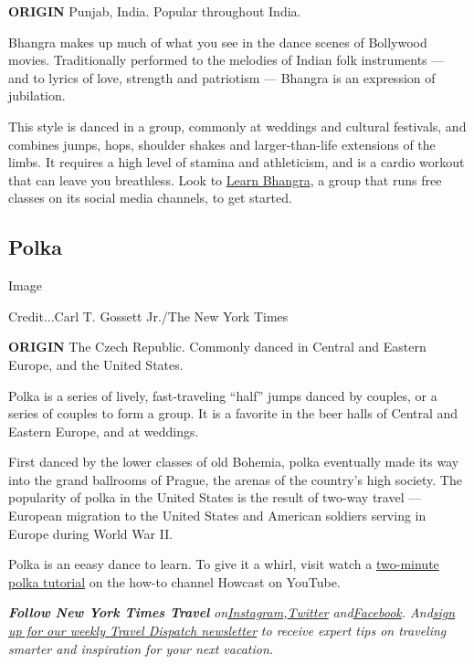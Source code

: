 \textbf{ORIGIN} Punjab, India. Popular throughout India.

Bhangra makes up much of what you see in the dance scenes of Bollywood
movies. Traditionally performed to the melodies of Indian folk
instruments --- and to lyrics of love, strength and patriotism ---
Bhangra is an expression of jubilation.

This style is danced in a group, commonly at weddings and cultural
festivals, and combines jumps, hops, shoulder shakes and
larger-than-life extensions of the limbs. It requires a high level of
stamina and athleticism, and is a cardio workout that can leave you
breathless. Look to \href{https://learnbhangra.com/}{Learn Bhangra}, a
group that runs free classes on its social media channels, to get
started.

\hypertarget{polka}{%
\subsection{Polka}\label{polka}}

Image

Credit...Carl T. Gossett Jr./The New York Times

\textbf{ORIGIN} The Czech Republic. Commonly danced in Central and
Eastern Europe, and the United States.

Polka is a series of lively, fast-traveling ``half'' jumps danced by
couples, or a series of couples to form a group. It is a favorite in the
beer halls of Central and Eastern Europe, and at weddings.

First danced by the lower classes of old Bohemia, polka eventually made
its way into the grand ballrooms of Prague, the arenas of the country's
high society. The popularity of polka in the United States is the result
of two-way travel --- European migration to the United States and
American soldiers serving in Europe during World War II.

Polka is an eeasy dance to learn. To give it a whirl, visit watch a
\href{https://www.youtube.com/watch?v=y846w6PUmCw}{two-minute polka
tutorial} on the how-to channel Howcast on YouTube.

\emph{\textbf{Follow New York Times Travel}}
\emph{on}\href{https://www.instagram.com/nytimestravel/}{\emph{Instagram}}\emph{,}\href{https://twitter.com/nytimestravel}{\emph{Twitter}}
\emph{and}\href{https://www.facebookcorewwwi.onion/nytimestravel/}{\emph{Facebook}}\emph{.
And}\href{https://www.nytimes3xbfgragh.onion/newsletters/traveldispatch}{\emph{sign
up for our weekly Travel Dispatch newsletter}} \emph{to receive expert
tips on traveling smarter and inspiration for your next vacation.}


